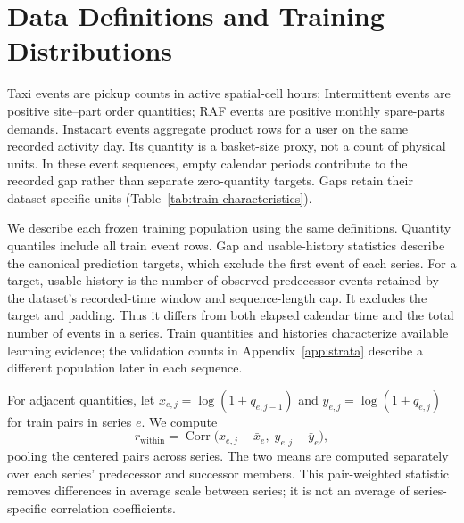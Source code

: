 
\section{Data Definitions and Training Distributions}\label{app:data-characteristics}
Taxi events are pickup counts in active spatial-cell hours; Intermittent
events are positive site--part order quantities; RAF events are positive
monthly spare-parts demands. Instacart events aggregate product rows for a
user on the same recorded activity day. Its quantity is a basket-size proxy,
not a count of physical units. In these event sequences, empty calendar
periods contribute to the recorded gap rather than separate zero-quantity
targets. Gaps retain their dataset-specific units (Table~\ref{tab:train-characteristics}).

We describe each frozen training population using the same definitions.
Quantity quantiles include all train event rows. Gap and usable-history
statistics describe the canonical prediction targets, which exclude the
first event of each series. For a target, usable history is the number of
observed predecessor events retained by the dataset's recorded-time window
and sequence-length cap. It excludes the target and padding. Thus it differs
from both elapsed calendar time and the total number of events in a series.
Train quantities and histories characterize available learning evidence;
the validation counts in Appendix~\ref{app:strata} describe a different
population later in each sequence.

For adjacent quantities, let $x_{e,j}=\log(1+q_{e,j-1})$ and
$y_{e,j}=\log(1+q_{e,j})$ for train pairs in series $e$. We compute
\begin{equation}
 r_{\mathrm{within}}=\operatorname{Corr}
 \bigl(x_{e,j}-\bar x_e,\;y_{e,j}-\bar y_e\bigr),
 \label{eq:within-correlation}
\end{equation}
pooling the centered pairs across series. The two means are computed
separately over each series' predecessor and successor members. This
pair-weighted statistic removes differences in average scale between series;
it is not an average of series-specific correlation coefficients.

